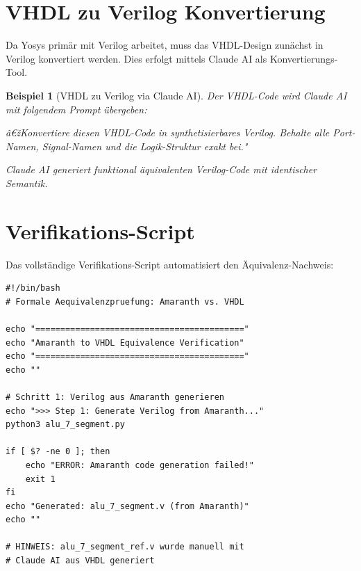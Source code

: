 ﻿\documentclass[12pt,a4paper]{report}
\newtheorem{beispiel}{Beispiel}[section]
\begin{document}
\section{VHDL zu Verilog Konvertierung}

Da Yosys primär mit Verilog arbeitet, muss das VHDL-Design zunächst in Verilog konvertiert werden. Dies erfolgt mittels Claude AI als Konvertierungs-Tool.

\begin{beispiel}[VHDL zu Verilog via Claude AI]
Der VHDL-Code wird Claude AI mit folgendem Prompt übergeben:

\textit{â€žKonvertiere diesen VHDL-Code in synthetisierbares Verilog. Behalte alle Port-Namen, Signal-Namen und die Logik-Struktur exakt bei."}

Claude AI generiert funktional äquivalenten Verilog-Code mit identischer Semantik.
\end{beispiel}

\section{Verifikations-Script}

Das vollständige Verifikations-Script automatisiert den Äquivalenz-Nachweis:

\begin{lstlisting}[style=bashstyle, caption={Verifikations-Script - Teil 1}]
#!/bin/bash
# Formale Aequivalenzpruefung: Amaranth vs. VHDL

echo "=========================================="
echo "Amaranth to VHDL Equivalence Verification"
echo "=========================================="
echo ""

# Schritt 1: Verilog aus Amaranth generieren
echo ">>> Step 1: Generate Verilog from Amaranth..."
python3 alu_7_segment.py

if [ $? -ne 0 ]; then
    echo "ERROR: Amaranth code generation failed!"
    exit 1
fi
echo "Generated: alu_7_segment.v (from Amaranth)"
echo ""

# HINWEIS: alu_7_segment_ref.v wurde manuell mit
# Claude AI aus VHDL generiert
\end{lstlisting}
\end{document}
